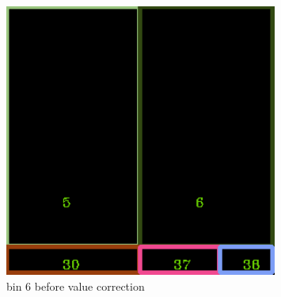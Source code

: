 \documentclass[11pt]{article}
\begin{document}
\begin{figure}
    \begin{minipage}[htb]{0.33\linewidth}
    \centering
    \includegraphics[width=0.8\textwidth]{FIGS/1/output6.png}
    \caption{bin 6 before value correction}
    \label{skyline}
    \end{minipage}
    \end{figure}
\end{document}
